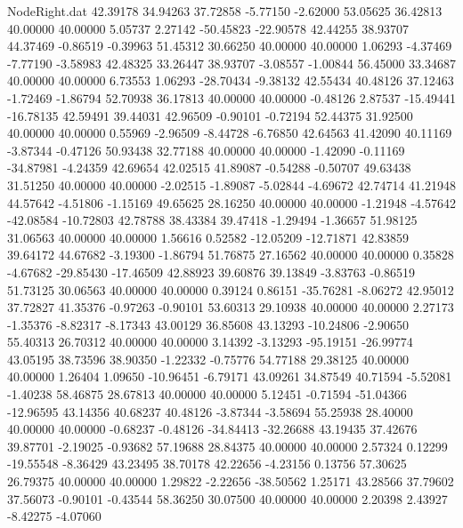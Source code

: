 \begin{filecontents}{NodeRight.dat}
  42.39178   34.94263   37.72858    -5.77150   -2.62000   53.05625   36.42813   40.00000   40.00000    5.05737    2.27142  -50.45823  -22.90578
  42.44255   38.93707   44.37469    -0.86519   -0.39963   51.45312   30.66250   40.00000   40.00000    1.06293   -4.37469   -7.77190   -3.58983
  42.48325   33.26447   38.93707    -3.08557   -1.00844   56.45000   33.34687   40.00000   40.00000    6.73553    1.06293  -28.70434   -9.38132
  42.55434   40.48126   37.12463    -1.72469   -1.86794   52.70938   36.17813   40.00000   40.00000   -0.48126    2.87537  -15.49441  -16.78135
  42.59491   39.44031   42.96509    -0.90101   -0.72194   52.44375   31.92500   40.00000   40.00000    0.55969   -2.96509   -8.44728   -6.76850
  42.64563   41.42090   40.11169    -3.87344   -0.47126   50.93438   32.77188   40.00000   40.00000   -1.42090   -0.11169  -34.87981   -4.24359
  42.69654   42.02515   41.89087    -0.54288   -0.50707   49.63438   31.51250   40.00000   40.00000   -2.02515   -1.89087   -5.02844   -4.69672
  42.74714   41.21948   44.57642    -4.51806   -1.15169   49.65625   28.16250   40.00000   40.00000   -1.21948   -4.57642  -42.08584  -10.72803
  42.78788   38.43384   39.47418    -1.29494   -1.36657   51.98125   31.06563   40.00000   40.00000    1.56616    0.52582  -12.05209  -12.71871
  42.83859   39.64172   44.67682    -3.19300   -1.86794   51.76875   27.16562   40.00000   40.00000    0.35828   -4.67682  -29.85430  -17.46509
  42.88923   39.60876   39.13849    -3.83763   -0.86519   51.73125   30.06563   40.00000   40.00000    0.39124    0.86151  -35.76281   -8.06272
  42.95012   37.72827   41.35376    -0.97263   -0.90101   53.60313   29.10938   40.00000   40.00000    2.27173   -1.35376   -8.82317   -8.17343
  43.00129   36.85608   43.13293   -10.24806   -2.90650   55.40313   26.70312   40.00000   40.00000    3.14392   -3.13293  -95.19151  -26.99774
  43.05195   38.73596   38.90350    -1.22332   -0.75776   54.77188   29.38125   40.00000   40.00000    1.26404    1.09650  -10.96451   -6.79171
  43.09261   34.87549   40.71594    -5.52081   -1.40238   58.46875   28.67813   40.00000   40.00000    5.12451   -0.71594  -51.04366  -12.96595
  43.14356   40.68237   40.48126    -3.87344   -3.58694   55.25938   28.40000   40.00000   40.00000   -0.68237   -0.48126  -34.84413  -32.26688
  43.19435   37.42676   39.87701    -2.19025   -0.93682   57.19688   28.84375   40.00000   40.00000    2.57324    0.12299  -19.55548   -8.36429
  43.23495   38.70178   42.22656    -4.23156    0.13756   57.30625   26.79375   40.00000   40.00000    1.29822   -2.22656  -38.50562    1.25171
  43.28566   37.79602   37.56073    -0.90101   -0.43544   58.36250   30.07500   40.00000   40.00000    2.20398    2.43927   -8.42275   -4.07060

\end{filecontents}
